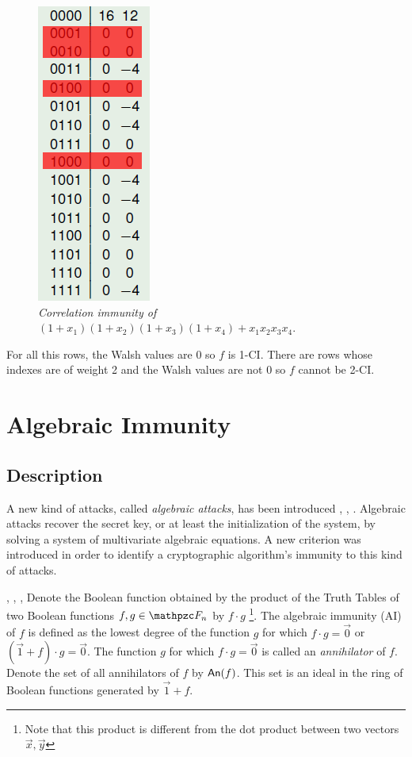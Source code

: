 \begin{example}
\begin{figure}[htbp!]
\centering
\includegraphics{ci}
\caption[Correlation immunity of f]{\textit{Correlation immunity of }$(1+x_1)(1+x_2)(1+x_3)(1+x_4)+x_1x_2x_3x_4$.}
\label{fig:ci}
\end{figure}

For all this rows, the Walsh values are $0$ so $f$ is 1-CI. There are rows whose indexes are of weight 2 and the Walsh values are not $0$ so $f$ cannot be 2-CI. 
\end{example}

\section{Algebraic Immunity} 

\subsection{Description}

A new kind of attacks, called \textit{algebraic attacks}, has been introduced \cite{Courtois:03},  \cite{Courtois:2003:FAA},  \cite{FaugereA:03}. Algebraic attacks recover the secret key, or at least the initialization of the system, by solving a system of multivariate algebraic
equations. A new criterion was introduced in order to identify a cryptographic algorithm's immunity to this kind of attacks.

\begin{definition}
 \cite{Courtois:03}, \cite{CourtoisM:02}, \cite{FaugereA:03}, \cite{MeierPC:04} Denote the Boolean function obtained by the product of the Truth Tables of two Boolean functions $f,g \in \funct{F}_n$ by $f \cdot g$ \footnote{Note that this product is different from the dot product between two vectors $\vec{x},\vec{y}$}. The algebraic immunity (AI) of $f$ is defined as the lowest degree of the function $g$ for which $f \cdot g = \vec{0}$ or $(\vec{1}+f) \cdot g = \vec{0}$. The function $g$ for which $f \cdot g = \vec{0}$ is called an \textit{annihilator} of $f$. Denote the set of all annihilators of $f$ by $\set{An}(f)$. This set is an ideal in the ring of Boolean functions generated by $\vec{1}+f$. 
\end{definition}

